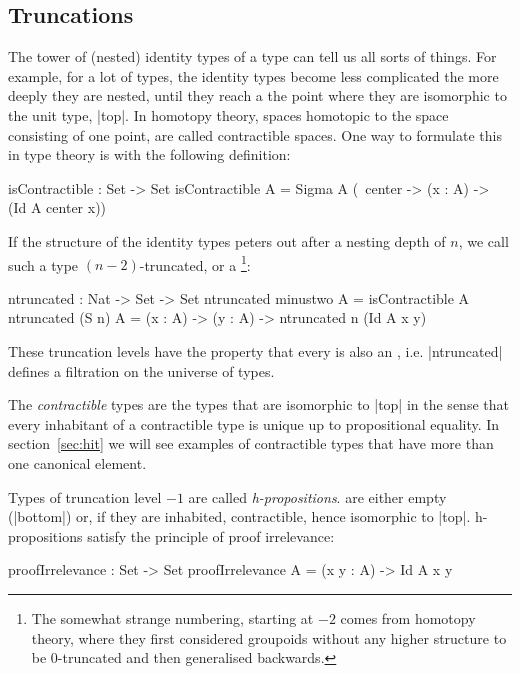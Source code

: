 \subsection{Truncations}
\label{sec:truncations}

The tower of (nested) identity types of a type can tell us all sorts
of things. For example, for a lot of types, the identity types become
less complicated the more deeply they are nested, until they reach a
the point where they are isomorphic to the unit type, |top|. In
homotopy theory, spaces homotopic to the space consisting of one
point, are called contractible spaces. One way to formulate this in
type theory is with the following definition:

\begin{code}
isContractible : Set -> Set
isContractible A = Sigma A (\ center -> (x : A) -> (Id A center x))
\end{code}

If the structure of the identity types peters out after a nesting
depth of $n$, we call such a type $(n-2)$-truncated, or a
\footnote{The somewhat strange numbering, starting at
  $-2$ comes from homotopy theory, where they first considered
  groupoids without any higher structure to be $0$-truncated and then
  generalised backwards.}:

\begin{code}
ntruncated : Nat -> Set -> Set
ntruncated minustwo  A = isContractible A
ntruncated (S n)     A = (x : A) -> (y : A) -> ntruncated n (Id A x y)
\end{code}

These truncation levels have the property that every  is also
an , i.e. |ntruncated| defines a filtration on the
universe of types.

The \emph{contractible} types are the types that are isomorphic to
|top| in the sense that every inhabitant of a contractible type is
unique up to propositional equality. In section~\ref{sec:hit} we will
see examples of contractible types that have more than one canonical
element.

Types of truncation level $-1$ are called
\emph{h-propositions}.  are either empty (|bottom|) or,
if they are inhabited, contractible, hence isomorphic to
|top|. h-propositions satisfy the principle of proof irrelevance:

\begin{code}
  proofIrrelevance : Set -> Set
  proofIrrelevance A = (x y : A) -> Id A x y
\end{code}

